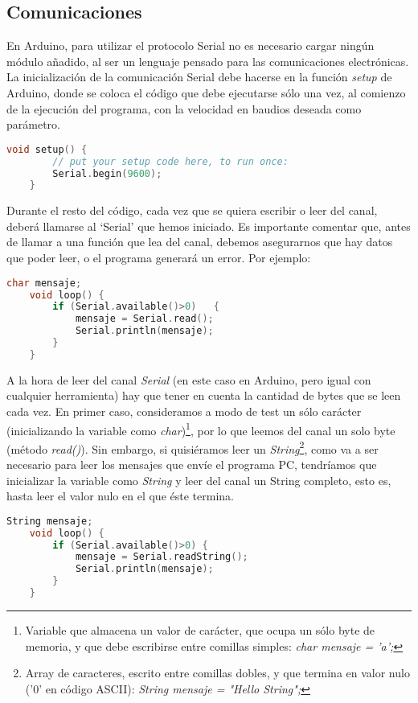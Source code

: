 \subsection{Comunicaciones}\label{subsec:ComunicacionesArduino}
En Arduino, para utilizar el protocolo Serial no es necesario cargar ningún módulo añadido, al ser un lenguaje pensado para las comunicaciones electrónicas. La inicialización de la comunicación Serial debe hacerse en la función \textit{setup} de Arduino, donde se coloca el código que debe ejecutarse sólo una vez, al comienzo de la ejecución del programa, con la velocidad en baudios deseada como parámetro.
\begin{lstlisting}[language=C,caption={Inicialización del protocolo Serial}]
	void setup() {
		// put your setup code here, to run once:
		Serial.begin(9600);
	}
\end{lstlisting}
Durante el resto del código, cada vez que se quiera escribir o leer del canal, deberá llamarse al `Serial' que hemos iniciado. Es importante comentar que, antes de llamar a una función que lea del canal, debemos asegurarnos que hay datos que poder leer, o el programa generará un error. Por ejemplo:
\begin{lstlisting}[language=C,caption={Eco en Arduino: lee del canal Serial solo si hay datos para leer y lo escribe}]
	char mensaje;
	void loop() {
		if (Serial.available()>0)	{
			mensaje = Serial.read();   
			Serial.println(mensaje);
		}
	}
\end{lstlisting}
A la hora de leer del canal \textit{Serial} (en este caso en Arduino, pero igual con cualquier herramienta) hay que tener en cuenta la cantidad de bytes que se leen cada vez. En primer caso, consideramos a modo de test un sólo carácter (inicializando la variable como \textit{char})\footnote{Variable que almacena un valor de carácter, que ocupa un sólo byte de memoria, y que debe escribirse entre comillas simples:\textit{ char mensaje = 'a';}}, por lo que leemos del canal un solo byte (método \textit{read()}). Sin embargo, si quisiéramos leer un \textit{String}\footnote{Array de caracteres, escrito entre comillas dobles, y que termina en valor nulo ('0' en código ASCII): \textit{String mensaje =  "Hello String";}}, como va a ser necesario para leer los mensajes que envíe el programa PC, tendríamos que inicializar la variable como \textit{String} y leer del canal un String completo, esto es, hasta leer el valor nulo en el que éste termina.
\begin{lstlisting}[language=C,caption={Eco en Arduino con un String}]
	String mensaje;
	void loop() {
		if (Serial.available()>0) {
			mensaje = Serial.readString();     
			Serial.println(mensaje);
		}
	}
\end{lstlisting}

